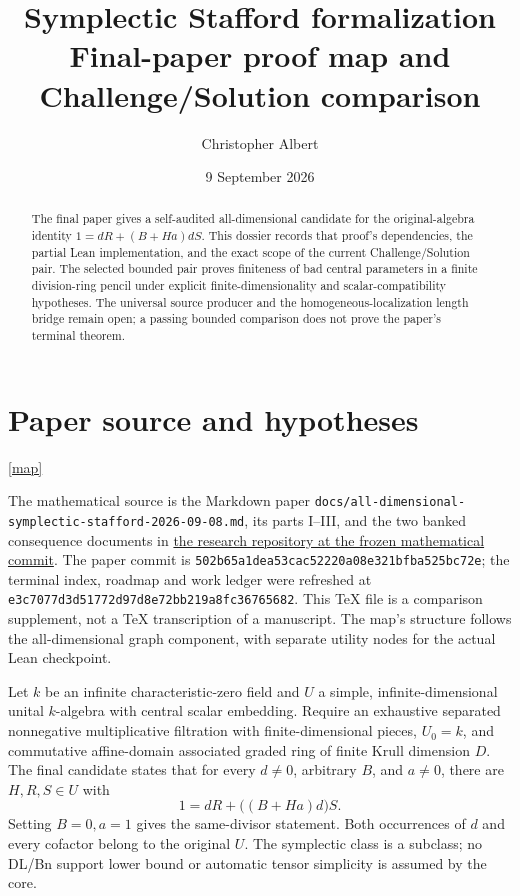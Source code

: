 \documentclass[10pt,a4paper]{article}
\title{Symplectic Stafford formalization\\[0.3em]
 \large Final-paper proof map and Challenge/Solution comparison}
\author{Christopher Albert}
\date{9 September 2026}
\newcommand{\backmap}{\hfill\hyperlink{proofmap}{[map]}}
\newcommand{\lean}[1]{\nolinkurl{#1}}
\begin{document}

\maketitle

\begin{abstract}
The final paper gives a self-audited all-dimensional candidate for the
original-algebra identity \(1=dR+(B+Ha)dS\). This dossier records that proof's
dependencies, the partial Lean implementation, and the exact scope of the
current Challenge/Solution pair. The selected bounded pair proves finiteness
of bad central parameters in a finite division-ring pencil under explicit
finite-dimensionality and scalar-compatibility hypotheses. The universal
source producer and the homogeneous-localization length bridge remain open;
a passing bounded comparison does not prove the paper's terminal theorem.
\end{abstract}

\section{Paper source and hypotheses}\label{sec:scope}\backmap

The mathematical source is the Markdown paper
\lean{docs/all-dimensional-symplectic-stafford-2026-09-08.md},
its parts I--III, and the two banked consequence documents in
\href{https://github.com/itpplasma/symplectic-stafford/tree/502b65a1dea53cac52220a08e321bfba525bc72e}
{the research repository at the frozen mathematical commit}.
The paper commit is
\lean{502b65a1dea53cac52220a08e321bfba525bc72e}; the terminal index,
roadmap and work ledger were refreshed at
\lean{e3c7077d3d51772d97d8e72bb219a8fc36765682}.
This TeX file is a comparison supplement, not a TeX transcription of a
manuscript. The map's structure follows the all-dimensional graph component,
with separate utility nodes for the actual Lean checkpoint.

Let \(k\) be an infinite characteristic-zero field and \(U\) a simple,
infinite-dimensional unital \(k\)-algebra with central scalar embedding.
Require an exhaustive separated nonnegative multiplicative filtration with
finite-dimensional pieces, \(U_0=k\), and commutative affine-domain
associated graded ring of finite Krull dimension \(D\). The final candidate
states that for every \(d\ne0\), arbitrary \(B\), and \(a\ne0\), there are
\(H,R,S\in U\) with
\[
  1=dR+\bigl((B+Ha)d\bigr)S.
\]
Setting \(B=0,a=1\) gives the same-divisor statement. Both occurrences of
\(d\) and every cofactor belong to the original \(U\). The symplectic class is
a subclass; no DL/Bn support lower bound or automatic tensor simplicity is
assumed by the core.
\end{document}
